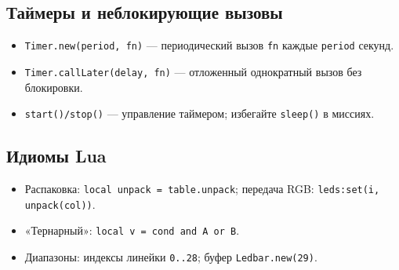 \subsection{Таймеры и неблокирующие вызовы}
\begin{itemize}
  \item \texttt{Timer.new(period, fn)} — периодический вызов \texttt{fn} каждые \texttt{period} секунд.
  \item \texttt{Timer.callLater(delay, fn)} — отложенный однократный вызов без блокировки.
  \item \texttt{start()/stop()} — управление таймером; избегайте \texttt{sleep()} в миссиях.
\end{itemize}

\subsection{Идиомы Lua}
\begin{itemize}
\item Распаковка: \texttt{local unpack = table.unpack}; передача RGB: \texttt{leds:set(i, unpack(col))}.
\item «Тернарный»: \texttt{local v = cond and A or B}.
\item Диапазоны: индексы линейки \texttt{0..28}; буфер \texttt{Ledbar.new(29)}.
\end{itemize}
